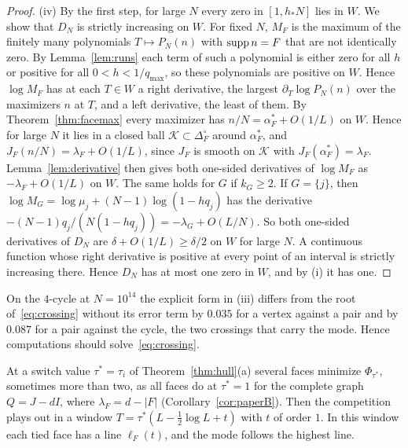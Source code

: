 \begin{proof}
(iv) By the first step, for large $N$ every zero in $[1,h_*N]$ lies in $W$. We show that $D_N$ is strictly increasing
on $W$. For fixed $N$, $M_F$ is the maximum of the finitely many polynomials $T\mapsto P_N(n)$
with $\operatorname{supp} n=F$ that are not identically zero. By Lemma~\ref{lem:runs} each term of such a
polynomial is either zero for all $h$ or positive for all $0<h<1/q_{\max}$, so these polynomials
are positive on $W$. Hence $\log M_F$ has at each $T\in W$ a right
derivative, the largest $\partial_T\log P_N(n)$ over the maximizers $n$ at $T$, and a left
derivative, the least of them. By Theorem~\ref{thm:facemax} every maximizer has
$n/N=\alpha^*_F+O(1/L)$ on $W$. Hence for large $N$ it lies in a closed ball
$\mathcal K\subset\Delta_F^\circ$ around $\alpha^*_F$, and $J_F(n/N)=\lambda_F+O(1/L)$, since
$J_F$ is smooth on $\mathcal K$ with $J_F(\alpha^*_F)=\lambda_F$. Lemma~\ref{lem:derivative}
then gives both one-sided derivatives of $\log M_F$ as $-\lambda_F+O(1/L)$ on $W$. The same
holds for $G$ if $k_G\ge2$. If $G=\{j\}$, then $\log M_G=\log\mu_j+(N-1)\log(1-hq_j)$ has the
derivative $-(N-1)q_j/(N(1-hq_j))=-\lambda_G+O(L/N)$. So both one-sided derivatives of $D_N$
are $\delta+O(1/L)\ge\delta/2$ on $W$ for large $N$. A continuous function whose right
derivative is positive at every point of an interval is strictly increasing there. Hence $D_N$
has at most one zero in $W$, and by (i) it has one.
\end{proof}

On the $4$-cycle at $N=10^{14}$ the explicit form in (iii) differs from the root
of~\eqref{eq:crossing} without its error term by $0.035$ for a vertex against a pair and by
$0.087$ for a pair against the cycle, the two crossings that carry the mode. Hence computations
should solve~\eqref{eq:crossing}.

At a switch value $\tau^*=\tau_i$ of Theorem~\ref{thm:hull}(a) several faces minimize
$\Phi_{\tau^*}$, sometimes more than two, as all faces do at $\tau^*=1$ for the
complete graph $Q=J-dI$, where $\lambda_F=d-|F|$\ifarxivbuild{} (Corollary~\ref{cor:paperB})\fi. Then the competition plays out in a window $T=\tau^*(L-\frac12\log L+t)$ with $t$ of
order $1$. In this window each tied face has a line $\ell_F(t)$, and the mode
follows the highest line.

